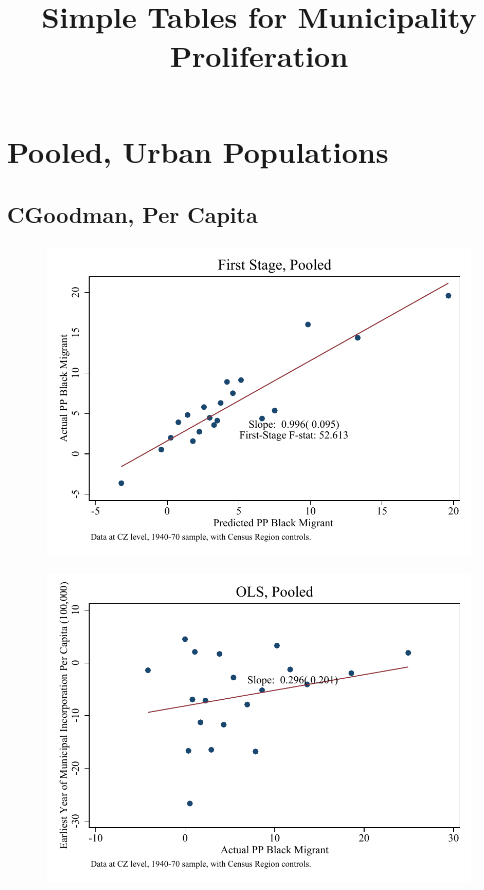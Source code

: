 \documentclass{article}
\title{Simple Tables for Municipality Proliferation}
\begin{document}
\maketitle
\tableofcontents
{\footnotesize 
\listoffigures
\listoftables}
\clearpage

\section{Pooled, Urban Populations}


\subsection{CGoodman, Per Capita}

\clearpage
\begin{figure}
\centering
\includegraphics{figures/simplefigs/pooled_cgoodman_pc_C3_fs.pdf}
\end{figure}
\clearpage
\begin{figure}
\centering
\includegraphics{figures/simplefigs/pooled_cgoodman_pc_C3_ols.pdf}
\end{figure}
\end{document}
